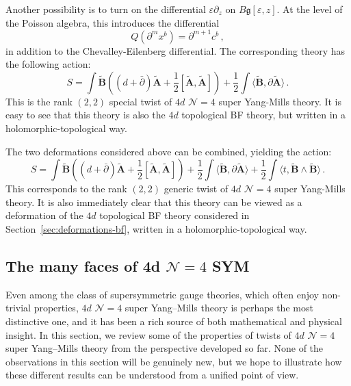\documentclass[11pt]{article}
\newcommand{\CE}{Chevalley-Eilenberg }
\numberwithin{equation}{section}
\begin{document}
Another possibility is to turn on the differential $\varepsilon\partial_z$ on $B\mathfrak{g}[\varepsilon,z]$. At the level of the Poisson algebra, this introduces the differential
\begin{equation}
	Q(\partial^mx^b) = \partial^{m+1}c^b\,,
\end{equation}
in addition to the \CE differential. The corresponding theory has the following action:
\begin{equation}
	S = \int \widetilde{\boldsymbol{B}}\left( (d+\bar{\partial})\widetilde{\boldsymbol{A}} + \frac{1}{2}[\widetilde{\boldsymbol{A}},\widetilde{\boldsymbol{A}}]\right) + \frac{1}{2}\int \langle \widetilde{\boldsymbol{B}}, \partial \widetilde{\boldsymbol{A}}\rangle\,.
\end{equation}
This is the rank $(2,2)$ special twist of $4d$ $\mathcal{N} = 4$ super Yang-Mills theory. It is easy to see that this theory is also the $4d$ topological BF theory, but written in a holomorphic-topological way.

The two deformations considered above can be combined, yielding the action:
\begin{equation}
	S = \int \widetilde{\boldsymbol{B}}\left( (d+\bar{\partial})\widetilde{\boldsymbol{A}} + \frac{1}{2}[\widetilde{\boldsymbol{A}},\widetilde{\boldsymbol{A}}]\right) + \frac{1}{2}\int \langle \widetilde{\boldsymbol{B}}, \partial \widetilde{\boldsymbol{A}}\rangle + \frac{1}{2}\int \langle t, \widetilde{\boldsymbol{B}}\wedge\widetilde{\boldsymbol{B}}\rangle\,.
\end{equation}
This corresponds to the rank $(2,2)$ generic twist of $4d$ $\mathcal{N} = 4$ super Yang-Mills theory. It is also immediately clear that this theory can be viewed as a deformation of the $4d$ topological BF theory considered in Section~\ref{sec:deformations-bf}, written in a holomorphic-topological way.

\subsection{The many faces of 4d $\mathcal{N} = 4$ SYM}
\label{sec:4dN4SYM}
Even among the class of supersymmetric gauge theories, which often enjoy non-trivial properties, $4d$ $\mathcal{N}=4$ super Yang--Mills theory is perhaps the most distinctive one, and it has been a rich source of both mathematical and physical insight. In this section, we review some of the properties of twists of $4d$ $\mathcal{N}=4$ super Yang--Mills theory from the perspective developed so far. None of the observations in this section will be genuinely new, but we hope to illustrate how these different results can be understood from a unified point of view.
\end{document}
